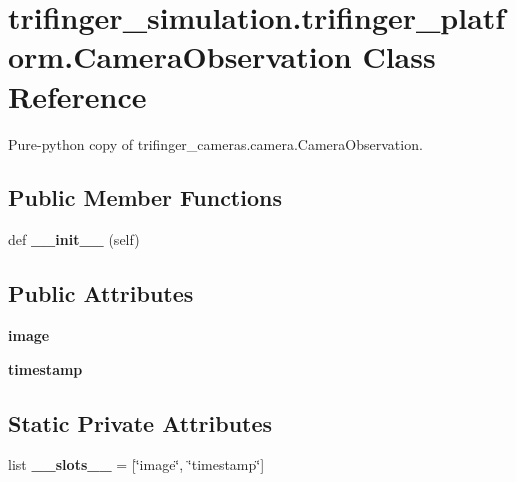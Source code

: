 \hypertarget{classtrifinger__simulation_1_1trifinger__platform_1_1CameraObservation}{}\section{trifinger\+\_\+simulation.\+trifinger\+\_\+platform.\+Camera\+Observation Class Reference}
\label{classtrifinger__simulation_1_1trifinger__platform_1_1CameraObservation}


Pure-\/python copy of trifinger\+\_\+cameras.\+camera.\+Camera\+Observation.  


\subsection*{Public Member Functions}
\begin{DoxyCompactItemize}
\item 
\mbox{\label{classtrifinger__simulation_1_1trifinger__platform_1_1CameraObservation_a8c6052304f5d6843c1d6b52f32817175}} 
def {\bfseries \+\_\+\+\_\+init\+\_\+\+\_\+} (self)
\end{DoxyCompactItemize}
\subsection*{Public Attributes}
\begin{DoxyCompactItemize}
\item 
\mbox{\label{classtrifinger__simulation_1_1trifinger__platform_1_1CameraObservation_ada255e89c292e56d46ae419f48512eac}} 
{\bfseries image}
\item 
\mbox{\label{classtrifinger__simulation_1_1trifinger__platform_1_1CameraObservation_a4aec6ea871981c158c45fc7e71896dac}} 
{\bfseries timestamp}
\end{DoxyCompactItemize}
\subsection*{Static Private Attributes}
\begin{DoxyCompactItemize}
\item 
\mbox{\label{classtrifinger__simulation_1_1trifinger__platform_1_1CameraObservation_a5dd6bdff1185f6b673ae99b796485a66}} 
list {\bfseries \+\_\+\+\_\+slots\+\_\+\+\_\+} = \mbox{[}\char`\"{}image\char`\"{}, \char`\"{}timestamp\char`\"{}\mbox{]}
\end{DoxyCompactItemize}


